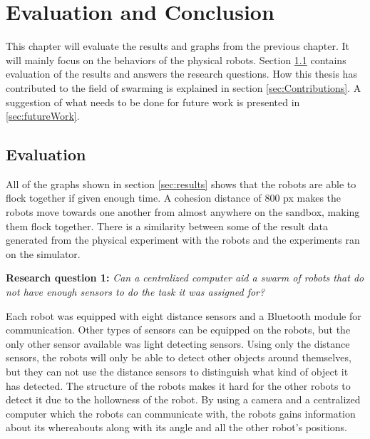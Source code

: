 \chapter{Evaluation and Conclusion}
\label{cha:evaluationAndConclusion}
This chapter will evaluate the results and graphs from the previous chapter. It will mainly focus on the behaviors of the physical robots. Section \ref{sec:Evaluation} contains evaluation of the results and answers the research questions. How this thesis has contributed to the field of swarming is explained in section \ref{sec:Contributions}. A suggestion of what needs to be done for future work is presented in \ref{sec:futureWork}.



\section{Evaluation}
\label{sec:Evaluation}
All of the graphs shown in section \ref{sec:results} shows that the robots are able to flock together if given enough time. A cohesion distance of 800 px makes the robots move towards one another from almost anywhere on the sandbox, making them flock together. There is a similarity between some of the result data generated from the physical experiment with the robots and the experiments ran on the simulator.

\textbf{Research question 1:} {\it Can a centralized computer aid a swarm of robots that do not have enough sensors to do the task it was assigned for?}

Each robot was equipped with eight distance sensors and a Bluetooth module for communication. Other types of sensors can be equipped on the robots, but the only other sensor available was light detecting sensors.
Using only the distance sensors, the robots will only be able to detect other objects around themselves, but they can not use the distance sensors to distinguish what kind of object it has detected. The structure of the robots makes it hard for the other robots to detect it due to the hollowness of the robot. 
By using a camera and a centralized computer which the robots can communicate with, the robots gains information about its whereabouts along with its angle and all the other robot's positions.

